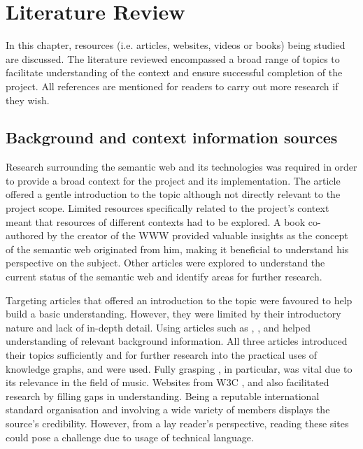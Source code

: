 \chapter{Literature Review}
In this chapter, resources (i.e. articles, websites, videos or books) being studied are discussed. The literature reviewed encompassed a broad range of topics to facilitate understanding of the context and ensure successful completion of the project. All references are mentioned for readers to carry out more research if they wish. 

\section{Background and context information sources}
\hspace{0.5cm} Research surrounding the semantic web and its technologies was required in order to provide a broad context for the project and its implementation. The article \cite{semanticweb} offered a gentle introduction to the topic although not directly relevant to the project scope. Limited resources specifically related to the project's context meant that resources of different contexts had to be explored. A book \cite{berners-TBLBook} co-authored by the creator of the WWW provided valuable insights as the concept of the semantic web originated from him, making it beneficial to understand his perspective on the subject. Other articles \cite{bizer2011linked} were explored to understand the current status of the semantic web and identify areas for further research. 

Targeting articles that offered an introduction to the topic were favoured to help build a basic understanding. However, they were limited by their introductory nature and lack of in-depth detail. Using articles such as \cite{ontology}, \cite{knowledgegraph}, \cite{studer_benjamins_fensel_1998} and \cite{rdf} helped understanding of relevant background information. All three articles introduced their topics sufficiently and for further research into the practical uses of knowledge graphs, \cite{searchengine} and \cite{oramas2016sound} were used. Fully grasping \cite{oramas2016sound}, in particular, was vital due to its relevance in the field of music. Websites from W3C \cite{TTL}, \cite{w3crdf} and \cite{w3cvocabularies} also facilitated research by filling gaps in understanding. Being a reputable international standard organisation and involving a wide variety of members displays the source's credibility. However, from a lay reader's perspective, reading these sites could pose a challenge due to usage of technical language. 

